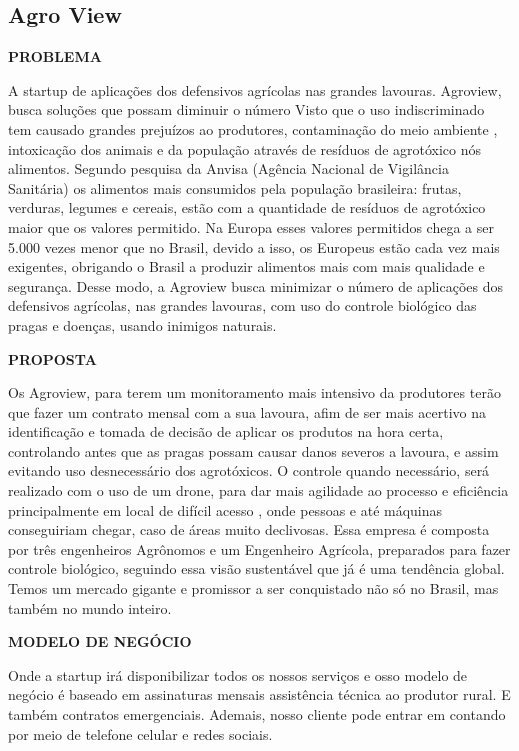 \subsection{Agro View}

\textbf{PROBLEMA}

A startup de aplicações dos defensivos agrícolas nas grandes lavouras. Agroview, busca soluções que possam diminuir o número 
Visto que o uso indiscriminado   tem causado grandes prejuízos ao produtores, contaminação do meio ambiente , intoxicação dos animais e da população através de resíduos de agrotóxico nós alimentos. Segundo pesquisa da Anvisa (Agência Nacional de Vigilância Sanitária) os alimentos mais consumidos pela população brasileira: frutas, verduras, legumes e cereais, estão com a quantidade de resíduos de agrotóxico maior que os valores permitido. Na Europa esses valores permitidos chega a ser 5.000 vezes menor que no Brasil, devido a isso, os Europeus 
estão cada vez mais exigentes, obrigando o Brasil a produzir alimentos mais com mais qualidade e segurança. Desse modo, a Agroview busca minimizar o número de aplicações dos defensivos agrícolas, nas grandes lavouras, com uso do controle biológico das pragas e doenças, usando inimigos naturais.

\textbf{PROPOSTA}

Os Agroview, para terem um monitoramento mais intensivo da  produtores terão que fazer um contrato mensal com a 
sua lavoura, afim de ser mais acertivo na identificação e tomada de decisão de aplicar os produtos  na hora certa, controlando antes que as pragas possam causar danos severos a lavoura, e assim  evitando uso desnecessário dos agrotóxicos. O controle quando necessário, será realizado com o uso de um drone, para dar mais agilidade ao processo e eficiência principalmente em local de difícil acesso , onde pessoas e até máquinas conseguiriam chegar, caso  de áreas muito declivosas. Essa empresa é composta por três engenheiros Agrônomos e um Engenheiro Agrícola, preparados para fazer controle biológico, seguindo  essa  visão sustentável que  já é uma tendência global. Temos um mercado gigante e promissor a ser  conquistado não só no Brasil, mas também no mundo inteiro.

\textbf{MODELO DE NEGÓCIO}

Onde a startup irá disponibilizar todos os nossos serviços e  osso modelo de negócio é baseado em assinaturas mensais assistência técnica ao produtor rural. E também contratos emergenciais. Ademais, nosso cliente pode entrar em contando por meio de telefone celular e redes sociais.


